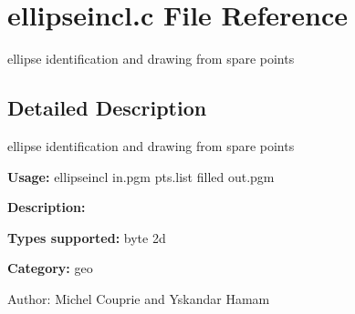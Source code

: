 \section{ellipseincl.c File Reference}
\label{ellipseincl_8c}
ellipse identification and drawing from spare points  




\label{_details}
\subsection{Detailed Description}
ellipse identification and drawing from spare points 

{\bf Usage:} ellipseincl in.pgm pts.list filled out.pgm

{\bf Description:}

{\bf Types supported:} byte 2d

{\bf Category:} geo

\begin{Desc}
\item[Author:]Michel Couprie and Yskandar Hamam \end{Desc}
